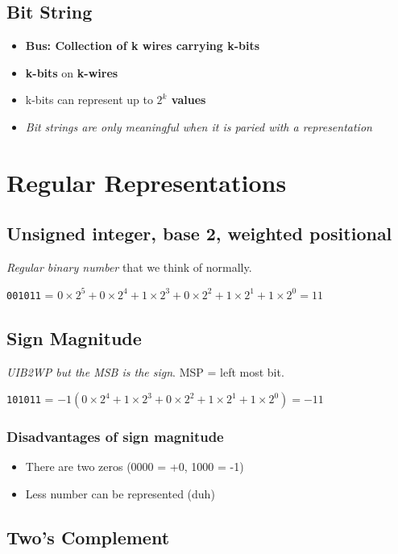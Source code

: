 \documentclass[11pt]{article}
\begin{document}
\subsection{Bit String}
\label{sec:org23b0f08}

\begin{itemize}
\item \textbf{Bus: Collection of k wires carrying k-bits}
\item \textbf{k-bits} on \textbf{k-wires}
\item k-bits can represent up to \textbf{\(2^k\) values}
\item \emph{Bit strings are only meaningful when it is paried with a representation}
\end{itemize}

\section{Regular Representations}
\label{sec:orgac5b3cc}

\subsection{Unsigned integer, base 2, weighted positional}
\label{sec:org2cec9a3}

\emph{Regular binary number} that we think of normally.

\texttt{001011} = \(0 \times 2^5 + 0 \times 2^4 + 1 \times 2^3 + 0 \times 2^2 + 1 \times 2^1 + 1 \times 2^0 = 11\)

\subsection{Sign Magnitude}
\label{sec:orgdb54637}

\emph{UIB2WP but the MSB is the sign}. MSP = left most bit.

\texttt{101011} = \(-1(0 \times 2^4 + 1 \times 2^3 + 0 \times 2^2 + 1 \times 2^1 + 1 \times 2^0) = -11\)

\subsubsection{Disadvantages of sign magnitude}
\label{sec:org08eafdd}

\begin{itemize}
\item There are two zeros (0000 = +0, 1000 = -1)
\item Less number can be represented (duh)
\end{itemize}

\subsection{Two's Complement}
\label{sec:org71029fa}
\end{document}

